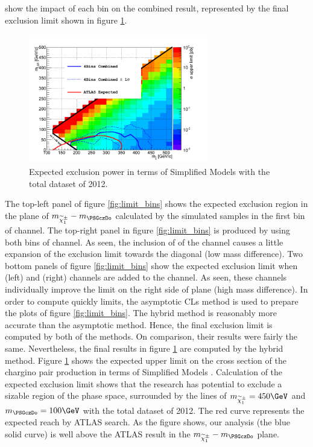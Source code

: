  show the impact of each bin on the combined result, represented by the final exclusion limit shown in figure \ref{fig:limit_final}. 
\begin{linenomath}
\begin{figure}[h]
\centering
\includegraphics[width=0.7\textwidth,keepaspectratio=true]{StatisticsFig/Exclusion4Bins.png}
\caption{Expected exclusion power in terms of Simplified Models
with the total dataset of 2012. 
}
\label{fig:limit_final}
\end{figure}
\end{linenomath}
The top-left panel of figure \ref{fig:limit_bins} shows the expected exclusion region in the plane of $m_{\chione}-m_{\PSGczDo}$
calculated by the simulated samples in the first bin of \tauTau channel. The top-right panel in figure \ref{fig:limit_bins} is produced by using both bins of \tauTau channel.
As seen, the inclusion of \bintwo of the \tauTau channel causes a little expansion of the exclusion limit towards 
the diagonal (low mass difference).
Two bottom panels of figure \ref{fig:limit_bins} show the expected exclusion limit when \eTau (left) and \muTau (right) channels are 
added to the \tauTau channel.  As seen, these channels individually improve the limit on the right side of plane (high mass difference).
In order to compute quickly limits, the asymptotic CLs method is used to prepare the plots of figure \ref{fig:limit_bins}.
The hybrid method is reasonably more accurate than the asymptotic method. Hence, the final exclusion limit is computed by both of the methods.
On comparison, their results were fairly the same. Nevertheless, the final results in figure \ref{fig:limit_final} are computed by the hybrid method.
Figure \ref{fig:limit_final} shows the expected upper limit on the cross section of the chargino pair production in terms of Simplified Models \cite{alves:sms}. 
Calculation of the expected exclusion limit shows that the research has potential to exclude 
a sizable region of the phase space, surrounded by the lines of $m_{\chione} = 450\GeV$ and $m_{\PSGczDo} = 100\GeV$ with 
the total dataset of 2012.
The red curve represents the expected reach by ATLAS %
search. As the figure shows, our analysis (the blue solid curve) is well above the ATLAS result in the $m_{\chione}-m_{\PSGczDo}$ plane.
